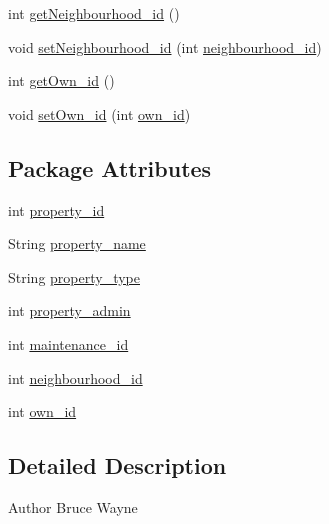 \begin{DoxyCompactItemize}
\item 
int \mbox{\hyperlink{classcms_1_1_property_a3ba973134882b53005aff159a4c858d6}{get\+Neighbourhood\+\_\+id}} ()
\item 
void \mbox{\hyperlink{classcms_1_1_property_ad09af4965ffd46ec8270d58e8d956e40}{set\+Neighbourhood\+\_\+id}} (int \mbox{\hyperlink{classcms_1_1_property_a68a7a76b323d88f8ddcc351265e7fd25}{neighbourhood\+\_\+id}})
\item 
int \mbox{\hyperlink{classcms_1_1_property_a92087914fe229f07d08e5ee4935d076d}{get\+Own\+\_\+id}} ()
\item 
void \mbox{\hyperlink{classcms_1_1_property_a30e854f22efcebf4069e9368cdc189df}{set\+Own\+\_\+id}} (int \mbox{\hyperlink{classcms_1_1_property_aa764bfa22c7dcc85bfdbc152dcf1a9f7}{own\+\_\+id}})
\end{DoxyCompactItemize}
\subsection*{Package Attributes}
\begin{DoxyCompactItemize}
\item 
int \mbox{\hyperlink{classcms_1_1_property_a599f759f4e0076578bf5a39c494a978d}{property\+\_\+id}}
\item 
String \mbox{\hyperlink{classcms_1_1_property_a35fcc951b43bfcb151fae422a0a61a1a}{property\+\_\+name}}
\item 
String \mbox{\hyperlink{classcms_1_1_property_a16bbd8f821050042e83a42d814fc42cc}{property\+\_\+type}}
\item 
int \mbox{\hyperlink{classcms_1_1_property_a24082a4e64c157c5ef3b9238f58dba4c}{property\+\_\+admin}}
\item 
int \mbox{\hyperlink{classcms_1_1_property_a8da95f059e18d03376e179cbe5861043}{maintenance\+\_\+id}}
\item 
int \mbox{\hyperlink{classcms_1_1_property_a68a7a76b323d88f8ddcc351265e7fd25}{neighbourhood\+\_\+id}}
\item 
int \mbox{\hyperlink{classcms_1_1_property_aa764bfa22c7dcc85bfdbc152dcf1a9f7}{own\+\_\+id}}
\end{DoxyCompactItemize}


\subsection{Detailed Description}
\begin{DoxyAuthor}{Author}
Bruce Wayne 
\end{DoxyAuthor}


